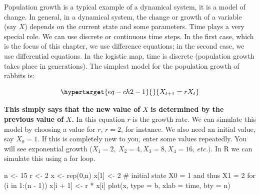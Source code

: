 \documentclass[
  letterpaper,
]{scrbook}
\newenvironment{Shaded}{\begin{snugshade}}{\end{snugshade}}
\newcommand{\AttributeTok}[1]{\textcolor[rgb]{0.40,0.45,0.13}{#1}}
\newcommand{\CommentTok}[1]{\textcolor[rgb]{0.37,0.37,0.37}{#1}}
\newcommand{\ControlFlowTok}[1]{\textcolor[rgb]{0.00,0.23,0.31}{#1}}
\newcommand{\DecValTok}[1]{\textcolor[rgb]{0.68,0.00,0.00}{#1}}
\newcommand{\FunctionTok}[1]{\textcolor[rgb]{0.28,0.35,0.67}{#1}}
\newcommand{\NormalTok}[1]{\textcolor[rgb]{0.00,0.23,0.31}{#1}}
\newcommand{\OtherTok}[1]{\textcolor[rgb]{0.00,0.23,0.31}{#1}}
\newcommand{\SpecialCharTok}[1]{\textcolor[rgb]{0.37,0.37,0.37}{#1}}
\newcommand{\StringTok}[1]{\textcolor[rgb]{0.13,0.47,0.30}{#1}}
\begin{document}
Population growth is a typical example of a dynamical system, it is a
model of change. In general, in a dynamical system, the change or growth
of a variable (say \(X\)) depends on the current state and some
parameters. Time plays a very special role. We can use discrete or
continuous time steps. In the first case, which is the focus of this
chapter, we use difference equations; in the second case, we use
differential equations. In the logistic map, time is discrete
(population growth takes place in generations). The simplest model for
the population growth of rabbits is:

\begin{equation}\protect\hypertarget{eq-ch2-1}{}{
X_{t + 1} = rX_{t}}\label{eq-ch2-1}\end{equation}

\textbf{This simply says that the new value of} \(X\) \textbf{is
determined by the previous value of} \(X\)\textbf{.} In this equation
\(r\) is the growth rate. We can simulate this model by choosing a value
for \(r\), \(r=2\), for instance. We also need an initial value, say
\(X_{0} = 1.\) If this is completely new to you, enter some values
repeatedly. You will see exponential growth
(\(X_{1} = 2,\ X_{2} = 4,X_{3} = 8,X_{4} = 16,\ etc.)\). In R we can
simulate this using a for loop.

\begin{Shaded}
\begin{Highlighting}[]
\NormalTok{n }\OtherTok{\textless{}{-}} \DecValTok{15}
\NormalTok{r }\OtherTok{\textless{}{-}} \DecValTok{2}
\NormalTok{x }\OtherTok{\textless{}{-}} \FunctionTok{rep}\NormalTok{(}\DecValTok{0}\NormalTok{,n)}
\NormalTok{x[}\DecValTok{1}\NormalTok{] }\OtherTok{\textless{}{-}} \DecValTok{2} \CommentTok{\# initial state X0 = 1 and thus X1 = 2}
\ControlFlowTok{for}\NormalTok{ (i }\ControlFlowTok{in} \DecValTok{1}\SpecialCharTok{:}\NormalTok{(n }\SpecialCharTok{{-}} \DecValTok{1}\NormalTok{))}
\NormalTok{  x[i }\SpecialCharTok{+} \DecValTok{1}\NormalTok{] }\OtherTok{\textless{}{-}}\NormalTok{ r }\SpecialCharTok{*}\NormalTok{ x[i]}
\FunctionTok{plot}\NormalTok{(x, }\AttributeTok{type =} \StringTok{\textquotesingle{}b\textquotesingle{}}\NormalTok{, }\AttributeTok{xlab =} \StringTok{\textquotesingle{}time\textquotesingle{}}\NormalTok{, }\AttributeTok{bty =} \StringTok{\textquotesingle{}n\textquotesingle{}}\NormalTok{)}
\end{Highlighting}
\end{Shaded}
\end{document}
